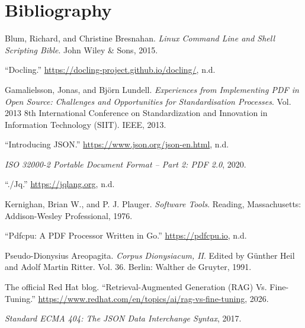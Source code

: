 \documentclass[
  letterpaper,
]{tufte-handout}
\newlength{\cslhangindent}
\newenvironment{CSLReferences}[2] %
 {\begin{list}{}{%
  \setlength{\itemindent}{0pt}
  \setlength{\leftmargin}{0pt}
  \setlength{\parsep}{0pt}
  \ifodd #1
   \setlength{\leftmargin}{\cslhangindent}
   \setlength{\itemindent}{-1\cslhangindent}
  \fi
  \setlength{\itemsep}{#2\baselineskip}}}
 {\end{list}}
\begin{document}
\clearpage

\section*{Bibliography}\label{bibliography}

\label{refs}
\begin{CSLReferences}{1}{0}
Blum, Richard, and Christine Bresnahan. \emph{Linux Command Line and
Shell Scripting Bible}. John Wiley \& Sons, 2015.

{``Docling.''} \url{https://docling-project.github.io/docling/}, n.d.

Gamalielsson, Jonas, and Björn Lundell. \emph{Experiences from
Implementing PDF in Open Source: Challenges and Opportunities for
Standardisation Processes}. Vol. 2013 8th International Conference on
Standardization and Innovation in Information Technology (SIIT). IEEE,
2013.

{``Introducing JSON.''} \url{https://www.json.org/json-en.html}, n.d.

\emph{ISO 32000-2 Portable Document Format -- Part 2: PDF 2.0}, 2020.

{``./Jq.''} \url{https://jqlang.org}, n.d.

Kernighan, Brian W., and P. J. Plauger. \emph{Software Tools}. Reading,
Massachusetts: Addison-Wesley Professional, 1976.

{``Pdfcpu: A PDF Processor Written in Go.''} \url{https://pdfcpu.io},
n.d.

Pseudo-Dionysius Areopagita. \emph{Corpus Dionysiacum, II}. Edited by
Günther Heil and Adolf Martin Ritter. Vol. 36. Berlin: Walther de
Gruyter, 1991.

The official Red Hat blog. {``Retrieval-Augmented Generation (RAG) Vs.
Fine-Tuning.''}
\url{https://www.redhat.com/en/topics/ai/rag-vs-fine-tuning}, 2026.

\emph{Standard ECMA 404: The JSON Data Interchange Syntax}, 2017.

\end{CSLReferences}
\end{document}
